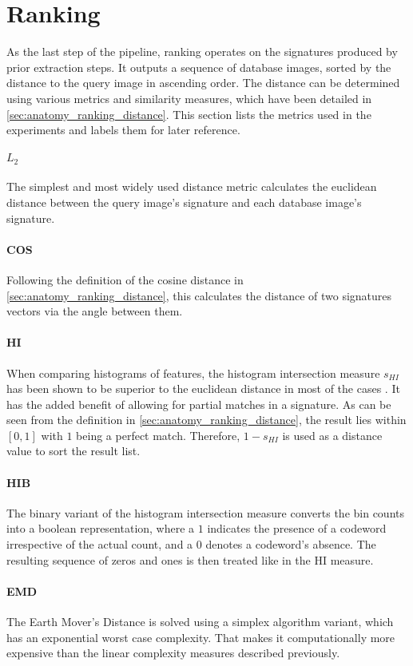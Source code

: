 \section{Ranking}

As the last step of the pipeline, ranking operates on the signatures produced
by prior extraction steps. It outputs a sequence of database images, sorted by
the distance to the query image in ascending order. The distance can be
determined using various metrics and similarity measures, which have been
detailed in \autoref{sec:anatomy_ranking_distance}. This section lists the
metrics used in the experiments and labels them for later reference.

\paragraph{$L_2$}

The simplest and most widely used distance metric calculates the euclidean
distance between the query image's signature and each database image's
signature.

\paragraph{COS}

Following the definition of the cosine distance in
\autoref{sec:anatomy_ranking_distance}, this calculates the distance of two
signatures vectors via the angle between them.

\paragraph{HI}

When comparing histograms of features, the histogram intersection measure
$s_{HI}$ has been shown to be superior to the euclidean distance in most of the
cases \autocite{wu_beyond_2009}. It has the added benefit of allowing for
partial matches in a signature. As can be seen from the definition in
\autoref{sec:anatomy_ranking_distance}, the result lies within $[0, 1]$ with
$1$ being a perfect match. Therefore, $1 - s_{HI}$ is used as a distance value
to sort the result list.

\paragraph{HIB}

The binary variant of the histogram intersection measure converts the bin
counts into a boolean representation, where a $1$ indicates the presence of a
codeword irrespective of the actual count, and a $0$ denotes a codeword's
absence. The resulting sequence of zeros and ones is then treated like in the
HI measure.

\paragraph{EMD}

The Earth Mover's Distance is solved using a simplex algorithm variant, which
has an exponential worst case complexity. That makes it computationally more
expensive than the linear complexity measures described previously.

